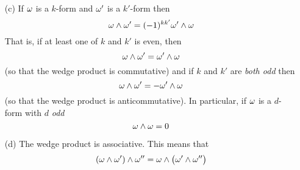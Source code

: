 \begin{defn}
\begin{enumerate}[(a)]



\end{enumerate}
\end{defn}

\addtocounter{theorem}{-1}
\begin{defn}[continued]
\begin{enumerate}[(a)]

\item[(c)] %
If $\omega$ is a $k$-form and $\omega'$ is a  $k'$-form then \begin{equation*}
   \omega\wedge\omega'=(-1)^{kk'}\omega'\wedge\omega
\end{equation*}
That is, if at least one of $k$ and $k'$ is even, then
\begin{equation*}
\omega\wedge\omega'=\omega'\wedge\omega
\end{equation*}
(so that the wedge product is commutative) 
and if $k$ and $k'$ are \emph{both odd} then 
\begin{equation*}
\omega\wedge\omega'=-\omega'\wedge\omega
\end{equation*} 
(so that the wedge product is anticommutative).
In particular, if $\omega$ is a $d$-form with $d$ \emph{odd}
\begin{equation*}
\omega\wedge\omega = 0
\end{equation*}

\item[(d)] %
The wedge product is associative. This means that
\begin{equation*}
(\omega\wedge\omega')\wedge\omega''=\omega\wedge\big(\omega'\wedge\omega''\big)
\end{equation*}

\end{enumerate}
\end{defn}


